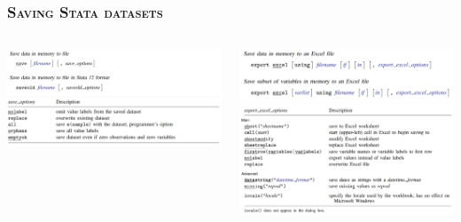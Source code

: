 \documentclass[10pt]{beamer}
\begin{document}
	\begin{frame}
	\frametitle{\textsc{Saving Stata datasets}}	
		\begin{columns}
			\begin{column}{0.5\textwidth}
				\includegraphics[width=\linewidth]{helpfile_save_1}
				\includegraphics[width=\linewidth]{helpfile_save_2}
			\end{column}
			\begin{column}{0.5\textwidth}
				\includegraphics[width=\linewidth]{helpfile_exportexcel_1}
				\includegraphics[width=\linewidth]{helpfile_exportexcel_2}
			\end{column}
		\end{columns}
	\end{frame}
	
\end{document}
